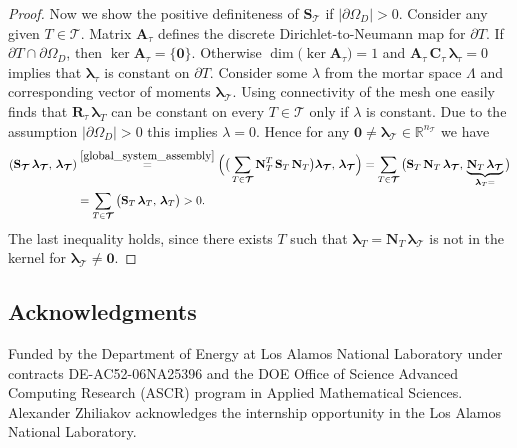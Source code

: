 \documentclass[12pt]{article}
\newcommand{\vect}[1]{\boldsymbol{\mathbf{#1}}}
\newcommand{\bcell}{T}
\newcommand{\bmesh}{{\vect{\mathcal T}}}
\newcommand{\mmesh}{{\vect{\mathcal \tau}}}
\DeclareMathOperator{\Ker}{ker}
\DeclareMathOperator{\Dim}{dim}
\begin{document}
\begin{proof}
		Now we show the positive definiteness of $\vect S_\bmesh$ if $|\partial\Omega_D|>0 $. Consider  any given $\bcell\in\bmesh$.
		Matrix  $\vect A_{\mmesh}$ defines the discrete Dirichlet-to-Neumann map for $\partial\bcell$.
		If $\partial\bcell\cap\partial\Omega_D$, then $\Ker \vect A_{\mmesh} = \{\vect 0\}$. Otherwise $\Dim\big(\Ker \vect A_{\mmesh}\big) = 1$ and $\vect A_{\mmesh}\,\vect C_{\mmesh}\,\vect\lambda_\mmesh=0$ implies that $\vect\lambda_\mmesh$ is constant on $\partial\bcell$. Consider some $\lambda$ from the mortar space $\Lambda$ and corresponding vector of moments  $\vect \lambda_\bmesh$. Using connectivity of the mesh one easily finds that $\vect R_\mmesh\,\vect\lambda_\bcell$ can be constant on every $T\in\bmesh$ only if $\lambda$ is constant. Due to the assumption $|\partial\Omega_D|>0$ this implies $\lambda=0$.
		Hence for any $\vect0\neq\vect\lambda_\bmesh\in \mathbb{R}^{n_\bmesh}$ we have
		\begin{align*}
		\left(\vect S_\bmesh\,\vect\lambda_\bmesh,\,\vect\lambda_\bmesh\right) &\stackrel{\eqref{global_system_assembly}}{=}
		\Big( \big( \sum_{\bcell \in \bmesh} \vect N^T_\bcell\,\vect S_\bcell\,\vect N_\bcell \big){\vect\lambda_\bmesh},\,{\vect\lambda_\bmesh} \Big) =
		\sum_{\bcell \in \bmesh} \big( \vect S_\bcell\,\vect N_\bcell\,{\vect\lambda_\bmesh},\,\underbrace{\vect N_\bcell\,{\vect\lambda_\bmesh}}_{{\vect \lambda_\bcell} =} \big) \\
		& = \sum_{\bcell \in \bmesh} \big(\vect S_\bcell\,{\vect \lambda_\bcell},\,{\vect \lambda_\bcell} \big) > 0.
		\end{align*}
		The last inequality holds, since there exists $\bcell$ such that $\vect \lambda_\bcell=\vect N_\bcell\,{\vect\lambda_\bmesh}$ is not in the kernel for $\vect\lambda_\bmesh\neq\vect0$.
	\end{proof}

	
	
	\subsection*{Acknowledgments} 
        Funded by the Department of Energy at Los Alamos National Laboratory
        under contracts DE-AC52-06NA25396 and the DOE Office of Science
        Advanced Computing Research (ASCR) program in Applied Mathematical
        Sciences. Alexander Zhiliakov acknowledges the internship opportunity in the Los Alamos National Laboratory.
	
	
	
\end{document}
